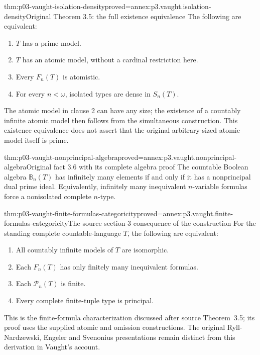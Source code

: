 \begin{hbtheorem}{thm:p03-vaught-isolation-density}{proved=annex:p3.vaught.isolation-density}{Original Theorem 3.5: the full existence equivalence}
The following are equivalent:
\begin{enumerate}
\item \(T\) has a prime model.
\item \(T\) has an atomic model, without a cardinal restriction here.
\item Every \(F_n(T)\) is atomistic.
\item For every \(n<\omega\), isolated types are dense in \(S_n(T)\).
\end{enumerate}
The atomic model in clause 2 can have any size; the existence of a
countably infinite atomic model then follows from the simultaneous
construction. This existence equivalence does not assert that the
original arbitrary-sized atomic model itself is prime.
\end{hbtheorem}

\begin{hblemma}{thm:p03-vaught-nonprincipal-algebra}{proved=annex:p3.vaught.nonprincipal-algebra}{Original fact 3.6 with its complete algebra proof}
The countable Boolean algebra \(\mathbb B_n(T)\) has infinitely many
elements if and only if it has a nonprincipal dual prime ideal.
Equivalently, infinitely many inequivalent \(n\)-variable formulas
force a nonisolated complete \(n\)-type.
\end{hblemma}

\begin{hbtheorem}{thm:p03-vaught-finite-formulas-categoricity}{proved=annex:p3.vaught.finite-formulas-categoricity}{The source section 3 consequence of the construction}
For the standing complete countable-language \(T\), the following
are equivalent:
\begin{enumerate}
\item All countably infinite models of \(T\) are isomorphic.
\item Each \(F_n(T)\) has only finitely many inequivalent formulas.
\item Each \(\mathcal P_n(T)\) is finite.
\item Every complete finite-tuple type is principal.
\end{enumerate}
This is the finite-formula characterization discussed after source
Theorem~3.5; its proof uses the supplied atomic and omission constructions.
The original Ryll-Nardzewski, Engeler and Svenonius presentations
remain distinct from this derivation in Vaught's account.
\end{hbtheorem}

